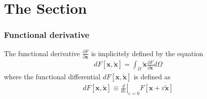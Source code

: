 


\begin{frame} \titlepage \end{frame}


\section{The Section}
\begin{frame}
  \frametitle{Functional derivative}
  The functional derivative  $\frac{\partial F}{\partial\mathbf{x}}$ is implicitely defined by the equation
  \begin{align*}
dF\left[\mathbf{x},\tilde{\mathbf{x}}\right]=\int_{\Omega}\tilde{\mathbf{x}}\frac{\partial F}{\partial\mathbf{x}}d\Omega
  \end{align*}
  where the functional differential $dF\left[\mathbf{x},\tilde{\mathbf{x}}\right]$ is defined as
  \begin{align*}
    dF\left[\mathbf{x},\tilde{\mathbf{x}}\right]\equiv\left.\frac{d}{d\varepsilon}\right|_{\varepsilon=0}F\left[\mathbf{x}+\varepsilon\tilde{\mathbf{x}}\right]
  \end{align*}
\end{frame}


